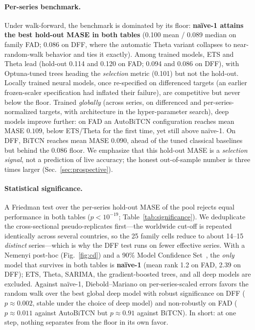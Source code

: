 \documentclass[runningheads]{llncs}
\begin{document}
\paragraph{Per-series benchmark.} Under walk-forward, the benchmark is dominated by
its floor: \textbf{naïve-1 attains the best hold-out MASE in both tables} (0.100
mean / 0.089 median on family FAD; 0.086 on DFF, where the automatic Theta variant
collapses to near-random-walk behavior and ties it exactly). Among trained models,
ETS and Theta lead (hold-out 0.114 and 0.120 on FAD; 0.094 and 0.086 on DFF), with
Optuna-tuned trees heading the \emph{selection} metric (0.101) but not the
hold-out. Locally trained neural models, once re-specified on differenced targets
(an earlier frozen-scaler specification had inflated their failure), are
competitive but never below the floor. Trained \emph{globally} (across series, on
differenced and per-series-normalized targets, with architecture in the
hyper-parameter search), deep models improve further: on FAD an AutoBiTCN
configuration reaches mean MASE $0.109$, below ETS/Theta for the first time, yet
still above naïve-1. On DFF, BiTCN reaches mean MASE $0.090$, ahead of the tuned
classical baselines but behind the 0.086 floor. We emphasize that this hold-out
MASE is a \emph{selection signal}, not a prediction of live accuracy; the honest
out-of-sample number is three times larger (Sec.~\ref{sec:prospective}).

\paragraph{Statistical significance.} A Friedman test over the per-series hold-out
MASE of the pool rejects equal performance in both tables ($p<10^{-19}$;
Table~\ref{tab:significance}). We deduplicate the cross-sectional pseudo-replicates
first---the worldwide cut-off is repeated identically across several countries, so the
25 family cells reduce to about 14--15 \emph{distinct} series---which is why the DFF
test runs on fewer effective series. With a Nemenyi post-hoc (Fig.~\ref{fig:cd}) and a
90\% Model Confidence Set~\cite{hansen2011}, the \emph{only} model that survives in
both tables is \textbf{naïve-1} (mean rank 1.2 on FAD, 2.39 on DFF); ETS, Theta,
SARIMA, the gradient-boosted trees, and all deep models are excluded. Against
naïve-1, Diebold--Mariano on per-series-scaled errors favors the random walk over
the best global deep model with robust significance on DFF ($p\approx0.002$, stable
under the choice of deep model) and non-robustly on FAD ($p\approx0.011$ against
AutoBiTCN but $p\approx0.91$ against BiTCN). In short: at one step, nothing
separates from the floor in its own favor.
\end{document}
